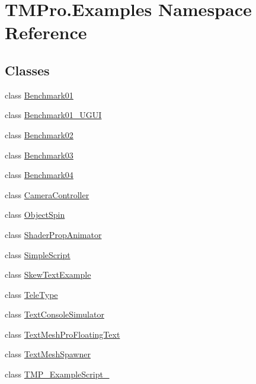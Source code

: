 \hypertarget{namespace_t_m_pro_1_1_examples}{}\section{T\+M\+Pro.\+Examples Namespace Reference}
\label{namespace_t_m_pro_1_1_examples}
\subsection*{Classes}
\begin{DoxyCompactItemize}
\item 
class \hyperlink{class_t_m_pro_1_1_examples_1_1_benchmark01}{Benchmark01}
\item 
class \hyperlink{class_t_m_pro_1_1_examples_1_1_benchmark01___u_g_u_i}{Benchmark01\+\_\+\+U\+G\+UI}
\item 
class \hyperlink{class_t_m_pro_1_1_examples_1_1_benchmark02}{Benchmark02}
\item 
class \hyperlink{class_t_m_pro_1_1_examples_1_1_benchmark03}{Benchmark03}
\item 
class \hyperlink{class_t_m_pro_1_1_examples_1_1_benchmark04}{Benchmark04}
\item 
class \hyperlink{class_t_m_pro_1_1_examples_1_1_camera_controller}{Camera\+Controller}
\item 
class \hyperlink{class_t_m_pro_1_1_examples_1_1_object_spin}{Object\+Spin}
\item 
class \hyperlink{class_t_m_pro_1_1_examples_1_1_shader_prop_animator}{Shader\+Prop\+Animator}
\item 
class \hyperlink{class_t_m_pro_1_1_examples_1_1_simple_script}{Simple\+Script}
\item 
class \hyperlink{class_t_m_pro_1_1_examples_1_1_skew_text_example}{Skew\+Text\+Example}
\item 
class \hyperlink{class_t_m_pro_1_1_examples_1_1_tele_type}{Tele\+Type}
\item 
class \hyperlink{class_t_m_pro_1_1_examples_1_1_text_console_simulator}{Text\+Console\+Simulator}
\item 
class \hyperlink{class_t_m_pro_1_1_examples_1_1_text_mesh_pro_floating_text}{Text\+Mesh\+Pro\+Floating\+Text}
\item 
class \hyperlink{class_t_m_pro_1_1_examples_1_1_text_mesh_spawner}{Text\+Mesh\+Spawner}
\item 
class \hyperlink{class_t_m_pro_1_1_examples_1_1_t_m_p___example_script__01}{T\+M\+P\+\_\+\+Example\+Script\+\_}

\end{DoxyCompactItemize}
